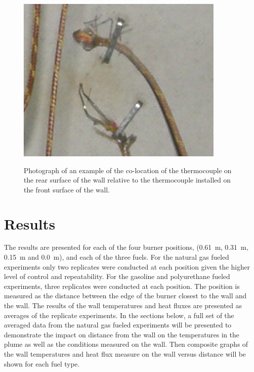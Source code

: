 \documentclass[twoside]{uocthesis}
\begin{document}
{\begin{figure}
	\centering
	\includegraphics[width=4.0in]{../Figures/Instrumented_Wall_Detail_Rear_TC_photo}\\
	\caption[Photograph of an example of the co-location of the thermocouple on the rear surface of the wall relative to the thermocouple installed on the front surface of the wall]{Photograph of an example of the co-location of the thermocouple on the rear surface of the wall relative to the thermocouple installed on the front surface of the wall.}
	\label{Instrumented_Wall_Detail_Rear_TC_photo}
\end{figure}

\section{Results}

The results are presented for each of the four burner positions, (0.61~m, 0.31~m, 0.15~m and 0.0~m), and each of the three fuels.  For the natural gas fueled experiments only two replicates were conducted at each position given the higher level of control and repeatability.  For the gasoline and polyurethane fueled experiments, three replicates were conducted at each position. The position is measured as the distance between the edge of the burner closest to the wall and the wall.  The results of the wall temperatures and heat fluxes are presented as averages of the replicate experiments.  In the sections below, a full set of the averaged data from the natural gas fueled experiments will be presented to demonstrate the impact on distance from the wall on the temperatures in the plume as well as the conditions measured on the wall. Then composite graphs of the wall temperatures and heat flux measure on the wall versus distance will be shown for each fuel type.


}
\end{document}
